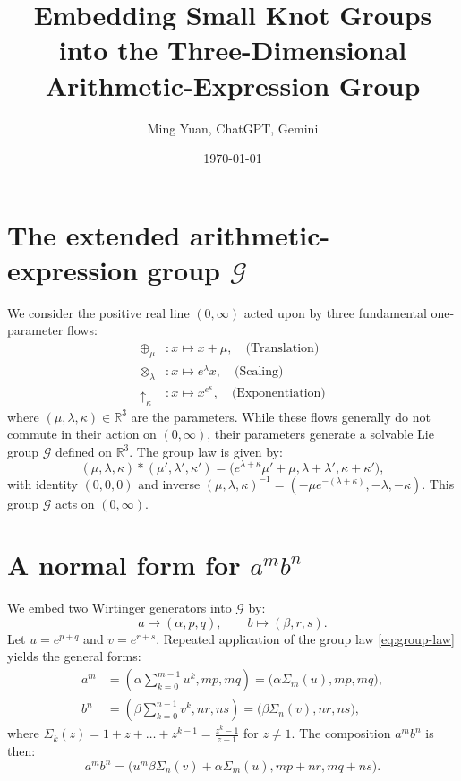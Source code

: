 \documentclass{article}
\title{Embedding Small Knot Groups into the Three-Dimensional Arithmetic-Expression Group}
\author{Ming Yuan, ChatGPT, Gemini} %
\date{\today}
\begin{document}
\maketitle

\section{The extended arithmetic-expression group $\mathcal{G}$}
We consider the positive real line $(0,\infty)$ acted upon by three fundamental one-parameter flows:
\begin{align}
\oplus_{\mu} &: x \mapsto x+\mu, \quad \text{(Translation)}\\
\otimes_{\lambda} &: x \mapsto e^{\lambda}x, \quad \text{(Scaling)}\\
\uparrow_{\kappa} &: x \mapsto x^{e^{\kappa}}, \quad \text{(Exponentiation)}
\end{align}
where $(\mu,\lambda,\kappa)\in\mathbb{R}^{3}$ are the parameters. While these flows generally do not commute in their action on $(0,\infty)$, their parameters generate a solvable Lie group $\mathcal{G}$ defined on $\mathbb{R}^3$. The group law is given by:
\begin{equation}
\label{eq:group-law}
(\mu,\lambda,\kappa)*(\mu',\lambda',\kappa') = \bigl(e^{\lambda+\kappa}\mu'+\mu, \lambda+\lambda', \kappa+\kappa'\bigr),
\end{equation}
with identity $(0,0,0)$ and inverse $(\mu,\lambda,\kappa)^{-1}=(-\mu e^{-(\lambda+\kappa)},-\lambda,-\kappa)$. This group $\mathcal{G}$ acts on $(0,\infty)$.

\section{A normal form for $a^{m}b^{n}$}
We embed two Wirtinger generators into $\mathcal{G}$ by:
\begin{equation}
a \longmapsto (\alpha, p, q), \qquad
b \longmapsto (\beta, r, s).
\end{equation}
Let $u = e^{p+q}$ and $v = e^{r+s}$. Repeated application of the group law \eqref{eq:group-law} yields the general forms:
\begin{align}
a^{m} &= \left(\alpha \sum_{k=0}^{m-1} u^k, mp, mq\right) = \bigl(\alpha\Sigma_{m}(u), mp, mq\bigr), \\
b^{n} &= \left(\beta \sum_{k=0}^{n-1} v^k, nr, ns\right) = \bigl(\beta\Sigma_{n}(v), nr, ns\bigr),
\end{align}
where $\Sigma_{k}(z)=1+z+\dots+z^{k-1} = \frac{z^k-1}{z-1}$ for $z \neq 1$.
The composition $a^m b^n$ is then:
\begin{equation}
\label{eq:am-bn}
a^{m}b^{n}=\bigl(u^m \beta\Sigma_{n}(v) + \alpha\Sigma_{m}(u), mp+nr, mq+ns\bigr).
\end{equation}
\end{document}
